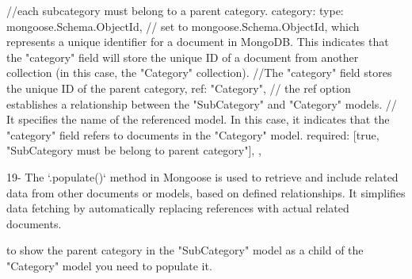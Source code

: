                                                 //each subcategory must belong to a parent category.
                                        category: {
                                            type: mongoose.Schema.ObjectId,  
                                                // set to mongoose.Schema.ObjectId, which represents a unique identifier for a document in MongoDB. This indicates that the "category" field will store the unique ID of a document from another collection (in this case, the "Category" collection).
                                                //The "category" field stores the unique ID of the parent category,
                                            ref: "Category", 
                                                // the ref option establishes a relationship between the "SubCategory" and "Category" models.
                                                // It specifies the name of the referenced model. In this case, it indicates that the "category" field refers to documents in the "Category" model.
                                            required: [true, "SubCategory must be belong to parent category"],
                                        },

19- The `.populate()` method in Mongoose is used to retrieve and include related data from other documents or models,
    based on defined relationships. It simplifies data fetching by automatically replacing references with actual related documents.


    to show the parent category in the "SubCategory" model as a child of the "Category" model you need to populate it.

